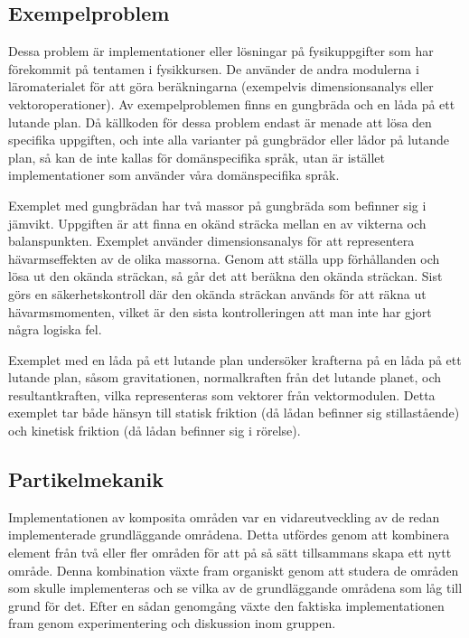 \subsection{Exempelproblem}
\begin{binge}
Dessa problem är implementationer eller lösningar på fysikuppgifter som har förekommit på tentamen i fysikkursen. De använder de andra modulerna i läromaterialet för att göra beräkningarna (exempelvis dimensionsanalys eller vektoroperationer). Av exempelproblemen finns en gungbräda och en låda på ett lutande plan. Då källkoden för dessa problem endast är menade att lösa den specifika uppgiften, och inte alla varianter på gungbrädor eller lådor på lutande plan, så kan de inte kallas för domänspecifika språk, utan är istället implementationer som använder våra domänspecifika språk.

Exemplet med gungbrädan har två massor på gungbräda som befinner sig i jämvikt. Uppgiften är att finna en okänd sträcka mellan en av vikterna och balanspunkten. Exemplet använder dimensionsanalys för att representera hävarmseffekten av de olika massorna. Genom att ställa upp förhållanden och lösa ut den okända sträckan, så går det att beräkna den okända sträckan. Sist görs en säkerhetskontroll där den okända sträckan används för att räkna ut hävarmsmomenten, vilket är den sista kontrolleringen att man inte har gjort några logiska fel.


Exemplet med en låda på ett lutande plan undersöker krafterna på en låda på ett lutande plan, såsom gravitationen, normalkraften från det lutande planet, och resultantkraften, vilka representeras som vektorer från vektormodulen. Detta exemplet tar både hänsyn till statisk friktion (då lådan befinner sig stillastående) och kinetisk friktion (då lådan befinner sig i rörelse).

\end{binge}
\subsection{Partikelmekanik}

Implementationen av komposita områden var en vidareutveckling av de redan
implementerade grundläggande områdena. Detta utfördes genom att kombinera
element från två eller fler områden för att på så sätt tillsammans skapa ett
nytt område. Denna kombination växte fram organiskt genom att studera de områden
som skulle implementeras och se vilka av de grundläggande områdena som
låg till grund för det. Efter en sådan genomgång växte den faktiska
implementationen fram genom experimentering och diskussion inom gruppen.

